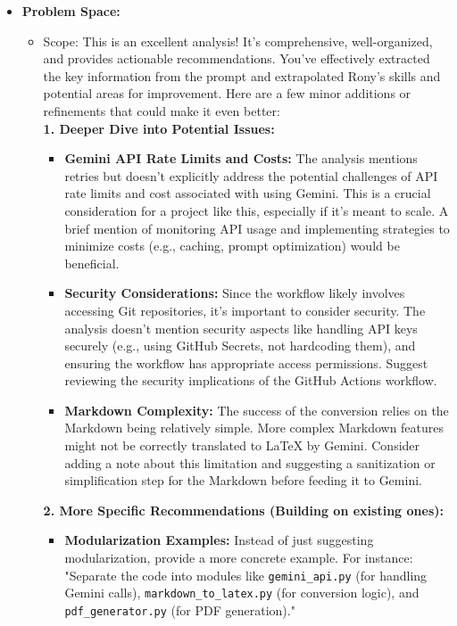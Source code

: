 \documentclass{article}
\begin{document}
\begin{itemize}
    \item \textbf{Problem Space:}
    \begin{itemize}
        \item Scope: This is an excellent analysis! It's comprehensive, well-organized, and provides actionable recommendations. You've effectively extracted the key information from the prompt and extrapolated Rony's skills and potential areas for improvement.  Here are a few minor additions or refinements that could make it even better: \\
        \textbf{1. Deeper Dive into Potential Issues:}
        \begin{itemize}
            \item \textbf{Gemini API Rate Limits and Costs:}  The analysis mentions retries but doesn't explicitly address the potential challenges of API rate limits and cost associated with using Gemini.  This is a crucial consideration for a project like this, especially if it's meant to scale. A brief mention of monitoring API usage and implementing strategies to minimize costs (e.g., caching, prompt optimization) would be beneficial.
            \item \textbf{Security Considerations:} Since the workflow likely involves accessing Git repositories, it's important to consider security. The analysis doesn't mention security aspects like handling API keys securely (e.g., using GitHub Secrets, not hardcoding them), and ensuring the workflow has appropriate access permissions. Suggest reviewing the security implications of the GitHub Actions workflow.
            \item \textbf{Markdown Complexity:}  The success of the conversion relies on the Markdown being relatively simple. More complex Markdown features might not be correctly translated to LaTeX by Gemini.  Consider adding a note about this limitation and suggesting a sanitization or simplification step for the Markdown before feeding it to Gemini.
        \end{itemize}
    \textbf{2. More Specific Recommendations (Building on existing ones):}
    \begin{itemize}
        \item \textbf{Modularization Examples:}  Instead of just suggesting modularization, provide a more concrete example. For instance: "Separate the code into modules like \texttt{gemini\_api.py} (for handling Gemini calls), \texttt{markdown\_to\_latex.py} (for conversion logic), and \texttt{pdf\_generator.py} (for PDF generation)."

\end{itemize}
\end{itemize}
\end{itemize}
\end{document}
